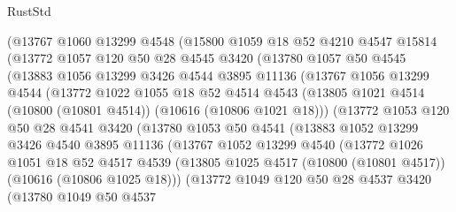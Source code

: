 \begin{lexlean}{RustStd}
\begin{coremodule}
        (@13767
          @1060
          @13299
          @4548
          (@15800
            @1059
            @18
            @52
            @4210
            @4547
            @15814
            (@13772
              @1057
              @120
              @50
              @28
              @4545
              @3420
              (@13780
                @1057
                @50
                @4545
                (@13883
                  @1056
                  @13299
                  @3426
                  @4544
                  @3895
                  @11136
                  (@13767
                    @1056
                    @13299
                    @4544
                    (@13772
                      @1022
                      @1055
                      @18
                      @52
                      @4514
                      @4543
                      (@13805 @1021 @4514 (@10800 (@10801 @4514)) (@10616 (@10806 @1021 @18)))
                      (@13772
                        @1053
                        @120
                        @50
                        @28
                        @4541
                        @3420
                        (@13780
                          @1053
                          @50
                          @4541
                          (@13883
                            @1052
                            @13299
                            @3426
                            @4540
                            @3895
                            @11136
                            (@13767
                              @1052
                              @13299
                              @4540
                              (@13772
                                @1026
                                @1051
                                @18
                                @52
                                @4517
                                @4539
                                (@13805
                                  @1025
                                  @4517
                                  (@10800 (@10801 @4517))
                                  (@10616 (@10806 @1025 @18)))
                                (@13772
                                  @1049
                                  @120
                                  @50
                                  @28
                                  @4537
                                  @3420
                                  (@13780
                                    @1049
                                    @50
                                    @4537

\end{coremodule}
\end{lexlean}
